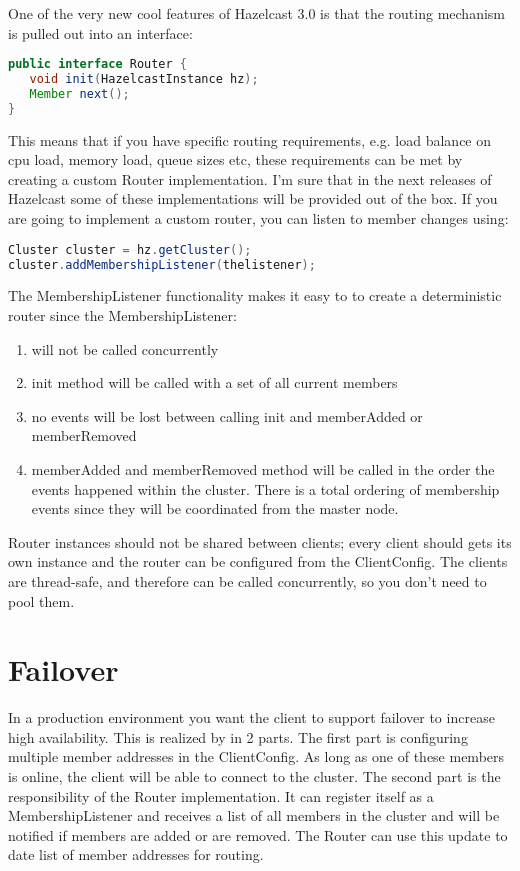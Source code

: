 One of the very new cool features of Hazelcast 3.0 is that the routing mechanism is pulled out into an interface:
\begin{lstlisting}[language=java]
public interface Router {
   void init(HazelcastInstance hz);
   Member next();
}
\end{lstlisting}
This means that if you have specific routing requirements, e.g. load balance on cpu load, memory load, queue sizes etc, these requirements can be met by creating a custom Router implementation. I'm sure that in the next releases of Hazelcast some of these implementations will be provided out of the box. If you are going to implement a custom router, you can listen to member changes using:
\begin{lstlisting}[language=java]
Cluster cluster = hz.getCluster();
cluster.addMembershipListener(thelistener);
\end{lstlisting}

The MembershipListener functionality makes it easy to to create a deterministic router since the MembershipListener:
\begin{enumerate}
\item will not be called concurrently
\item init method will be called with a set of all current members
\item no events will be lost between calling init and memberAdded or memberRemoved
\item memberAdded and memberRemoved method will be called in the order the events happened within the cluster. There is a total ordering of membership events since they will be coordinated from the master node.
\end{enumerate}

Router instances should not be shared between clients; every client should gets its own instance and the router can be configured from the ClientConfig. The clients are thread-safe, and therefore can be called concurrently, so you don't need to pool them.

\section{Failover} 
In a production environment you want the client to support failover to increase high availability. This is realized by in 2 parts. The first part is configuring multiple member addresses in the ClientConfig. As long as one of these members is online, the client will be able to connect to the cluster. The second part is the responsibility of the Router implementation. It can register itself as a MembershipListener and receives a list of all members in the cluster and will be notified if members are added or are removed. The Router can use this update to date list of member addresses for routing.


